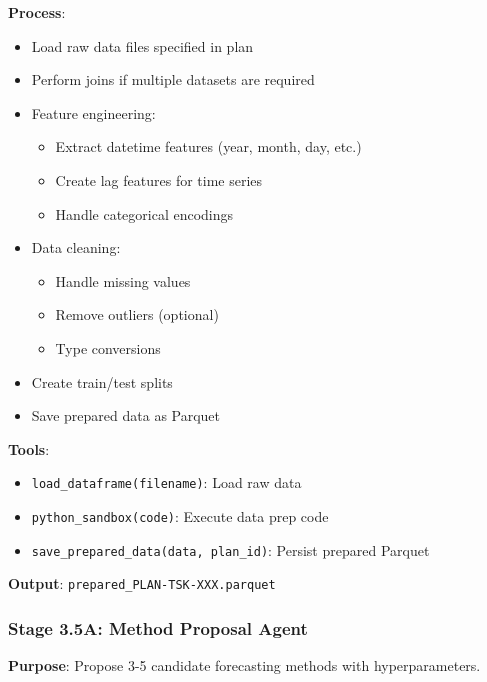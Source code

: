 \documentclass[11pt,a4paper]{article}
\begin{document}
\textbf{Process}:
\begin{itemize}
    \item Load raw data files specified in plan
    \item Perform joins if multiple datasets are required
    \item Feature engineering:
    \begin{itemize}
        \item Extract datetime features (year, month, day, etc.)
        \item Create lag features for time series
        \item Handle categorical encodings
    \end{itemize}
    \item Data cleaning:
    \begin{itemize}
        \item Handle missing values
        \item Remove outliers (optional)
        \item Type conversions
    \end{itemize}
    \item Create train/test splits
    \item Save prepared data as Parquet
\end{itemize}

\textbf{Tools}:
\begin{itemize}
    \item \texttt{load\_dataframe(filename)}: Load raw data
    \item \texttt{python\_sandbox(code)}: Execute data prep code
    \item \texttt{save\_prepared\_data(data, plan\_id)}: Persist prepared Parquet
\end{itemize}

\textbf{Output}: \texttt{prepared\_PLAN-TSK-XXX.parquet}

\subsubsection{Stage 3.5A: Method Proposal Agent}

\textbf{Purpose}: Propose 3-5 candidate forecasting methods with hyperparameters.
\end{document}
